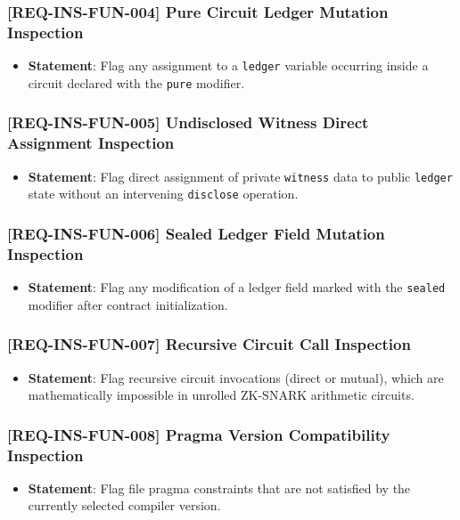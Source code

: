\subsubsection{[REQ-INS-FUN-004] Pure Circuit Ledger Mutation Inspection}
\begin{itemize}
    \item \textbf{Statement}: Flag any assignment to a \texttt{ledger} variable occurring inside a circuit declared with the \texttt{pure} modifier.
\end{itemize}

\subsubsection{[REQ-INS-FUN-005] Undisclosed Witness Direct Assignment Inspection}
\begin{itemize}
    \item \textbf{Statement}: Flag direct assignment of private \texttt{witness} data to public \texttt{ledger} state without an intervening \texttt{disclose} operation.
\end{itemize}

\subsubsection{[REQ-INS-FUN-006] Sealed Ledger Field Mutation Inspection}
\begin{itemize}
    \item \textbf{Statement}: Flag any modification of a ledger field marked with the \texttt{sealed} modifier after contract initialization.
\end{itemize}

\subsubsection{[REQ-INS-FUN-007] Recursive Circuit Call Inspection}
\begin{itemize}
    \item \textbf{Statement}: Flag recursive circuit invocations (direct or mutual), which are mathematically impossible in unrolled ZK-SNARK arithmetic circuits.
\end{itemize}

\subsubsection{[REQ-INS-FUN-008] Pragma Version Compatibility Inspection}
\begin{itemize}
    \item \textbf{Statement}: Flag file pragma constraints that are not satisfied by the currently selected compiler version.
\end{itemize}

